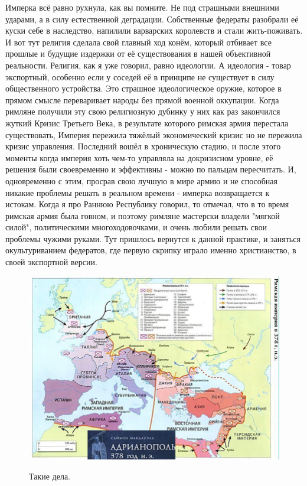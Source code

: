 Имперка всё равно рухнула, как вы помните. Не под страшными внешними ударами, а в силу естественной деградации. Собственные федераты разобрали её куски себе в наследство, напилили варварских королевств и стали жить-поживать. И вот тут религия сделала свой главный ход конём, который отбивает все прошлые и будущие издержки от её существования в нашей объективной реальности. Религия, как я уже говорил, равно идеологии. А идеология - товар экспортный, особенно если у соседей её в принципе не существует в силу общественного устройства. Это страшное идеологическое оружие, которое в прямом смысле переваривает народы без прямой военной оккупации. Когда римляне получили эту свою религиозную дубинку у них как раз закончился жуткий Кризис Третьего Века, в результате которого римская армия перестала существовать, Империя пережила тяжёлый экономический кризис но не пережила кризис управления. Последний вошёл в хроническую стадию, и после этого моменты когда империя хоть чем-то управляла на докризисном уровне, её решения были своевременно и эффективны - можно по пальцам пересчитать. И, одновременно с этим, просрав свою лучшую в мире армию и не способная никакие проблемы решать в реальном времени - имперка возвращается к истокам. Когда я про Раннюю Республику говорил, то отмечал, что в то время римская армия была говном, и поэтому римляне мастерски владели "мягкой силой", политическими многоходовочками, и очень любили решать свои проблемы чужими руками. Тут пришлось вернутся к данной практике, и заняться окультуриванием федератов, где первую скрипку играло именно христианство, в своей экспортной версии. 
\begin{figure}[h!tb]
	\centering\includegraphics[scale=0.55]{Relig_gambit/1572932315145887007.png}
	\label{fig:gambit6} %
	\caption{Такие дела. 	}
\end{figure}


